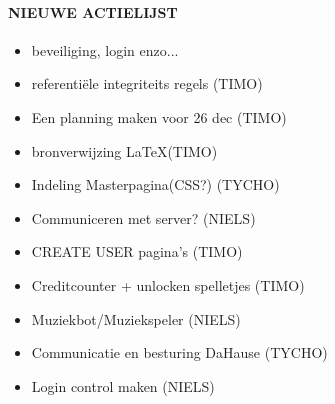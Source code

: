 \documentclass[11pt]{article}
\begin{document}
\begin{itemize}
\end{itemize}

\paragraph{NIEUWE ACTIELIJST}
\begin{itemize}
\item beveiliging, login enzo... 
\item referentiële integriteits regels (TIMO)
\item Een planning maken voor 26 dec (TIMO)
\item bronverwijzing \LaTeX (TIMO)
\item Indeling Masterpagina(CSS?) (TYCHO)
\item Communiceren met server? (NIELS)
\item CREATE USER pagina's (TIMO)
\item Creditcounter + unlocken spelletjes (TIMO)
\item Muziekbot/Muziekspeler (NIELS)
\item Communicatie en besturing DaHause (TYCHO)
\item Login control maken (NIELS)



\end{itemize}
\end{document}
